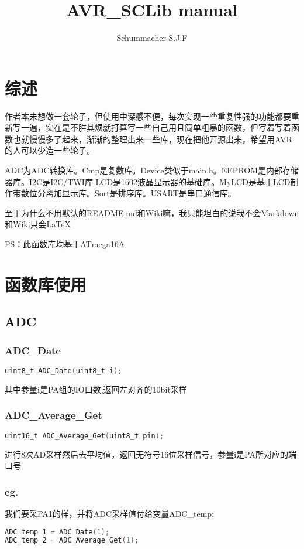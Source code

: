 \documentclass{report}
\title{AVR\_SCLib manual}
\begin{document}
\author{Schummacher S.J.F}
\maketitle
\newpage
\tableofcontents
\newpage
\chapter{综述}
作者本未想做一套轮子，但使用中深感不便，每次实现一些重复性强的功能都要重新写一遍，实在是不胜其烦就打算写一些自己用且简单粗暴的函数，但写着写着函数也就慢慢多了起来，渐渐的整理出来一些库，现在把他开源出来，希望用AVR的人可以少造一些轮子。\par
ADC为ADC转换库。Cmp是复数库。Device类似于main.h。EEPROM是内部存储器库。I2C是I2C/TWI库
LCD是1602液晶显示器的基础库。MyLCD是基于LCD制作带数位分离加显示库。Sort是排序库。USART是串口通信库。\par
至于为什么不用默认的README.md和Wiki嘛，我只能坦白的说我不会Markdown和Wiki只会\LaTeX\par
PS：此函数库均基于ATmega16A\par
\chapter{函数库使用}
\section{ADC}
\subsection{ADC\_Date}
\begin{lstlisting}[language=C]
uint8_t ADC_Date(uint8_t i);
\end{lstlisting}
其中参量i是PA组的IO口数,返回左对齐的10bit采样
\subsection{ADC\_Average\_Get}
\begin{lstlisting}[language=C]
uint16_t ADC_Average_Get(uint8_t pin);
\end{lstlisting}
进行8次AD采样然后去平均值，返回无符号16位采样信号，参量i是PA所对应的端口号
\subsection{eg.}
我们要采PA1的样，并将ADC采样值付给变量ADC\_temp:
\begin{lstlisting}[language=C]
ADC_temp_1 = ADC_Date(1);
ADC_temp_2 = ADC_Average_Get(1);
\end{lstlisting}
\end{document}
